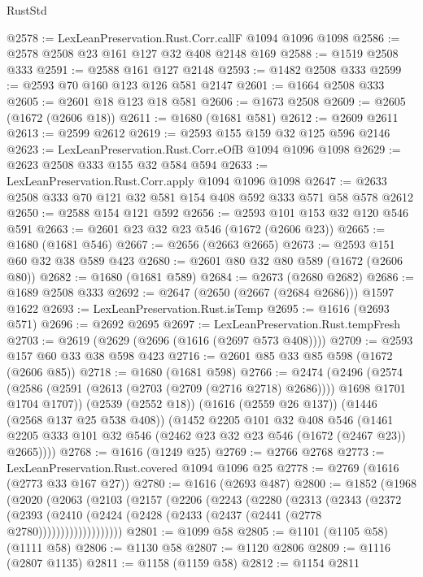 \begin{lexlean}{RustStd}
\begin{coremodule}
@2578 := LexLeanPreservation.Rust.Corr.callF @1094 @1096 @1098
@2586 := @2578 @2508 @23 @161 @127 @32 @408 @2148 @169
@2588 := @1519 @2508 @333
@2591 := @2588 @161 @127 @2148
@2593 := @1482 @2508 @333
@2599 := @2593 @70 @160 @123 @126 @581 @2147
@2601 := @1664 @2508 @333
@2605 := @2601 @18 @123 @18 @581
@2606 := @1673 @2508
@2609 := @2605 (@1672 (@2606 @18))
@2611 := @1680 (@1681 @581)
@2612 := @2609 @2611
@2613 := @2599 @2612
@2619 := @2593 @155 @159 @32 @125 @596 @2146
@2623 := LexLeanPreservation.Rust.Corr.eOfB @1094 @1096 @1098
@2629 := @2623 @2508 @333 @155 @32 @584 @594
@2633 := LexLeanPreservation.Rust.Corr.apply @1094 @1096 @1098
@2647 := @2633 @2508 @333 @70 @121 @32 @581 @154 @408 @592 @333 @571 @58 @578 @2612
@2650 := @2588 @154 @121 @592
@2656 := @2593 @101 @153 @32 @120 @546 @591
@2663 := @2601 @23 @32 @23 @546 (@1672 (@2606 @23))
@2665 := @1680 (@1681 @546)
@2667 := @2656 (@2663 @2665)
@2673 := @2593 @151 @60 @32 @38 @589 @423
@2680 := @2601 @80 @32 @80 @589 (@1672 (@2606 @80))
@2682 := @1680 (@1681 @589)
@2684 := @2673 (@2680 @2682)
@2686 := @1689 @2508 @333
@2692 := @2647 (@2650 (@2667 (@2684 @2686))) @1597 @1622
@2693 := LexLeanPreservation.Rust.isTemp
@2695 := @1616 (@2693 @571)
@2696 := @2692 @2695
@2697 := LexLeanPreservation.Rust.tempFresh
@2703 := @2619 (@2629 (@2696 (@1616 (@2697 @573 @408))))
@2709 := @2593 @157 @60 @33 @38 @598 @423
@2716 := @2601 @85 @33 @85 @598 (@1672 (@2606 @85))
@2718 := @1680 (@1681 @598)
@2766 := @2474
    (@2496
      (@2574 (@2586 (@2591 (@2613 (@2703 (@2709 (@2716 @2718) @2686)))) @1698 @1701 @1704 @1707))
      (@2539 (@2552 @18))
      (@1616 (@2559 @26 @137))
      (@1446 (@2568 @137 @25 @538 @408))
      (@1452
        @2205
        @101
        @32
        @408
        @546
        (@1461 @2205 @333 @101 @32 @546 (@2462 @23 @32 @23 @546 (@1672 (@2467 @23)) @2665))))
@2768 := @1616 (@1249 @25)
@2769 := @2766 @2768
@2773 := LexLeanPreservation.Rust.covered @1094 @1096 @25
@2778 := @2769 (@1616 (@2773 @33 @167 @27))
@2780 := @1616 (@2693 @487)
@2800 := @1852
    (@1968
      (@2020
        (@2063
          (@2103
            (@2157
              (@2206
                (@2243
                  (@2280
                    (@2313
                      (@2343
                        (@2372
                          (@2393
                            (@2410
                              (@2424 (@2428 (@2433 (@2437 (@2441 (@2778 @2780)))))))))))))))))))
@2801 := @1099 @58
@2805 := @1101 (@1105 @58) (@1111 @58)
@2806 := @1130 @58
@2807 := @1120 @2806
@2809 := @1116 (@2807 @1135)
@2811 := @1158 (@1159 @58)
@2812 := @1154 @2811

\end{coremodule}
\end{lexlean}
